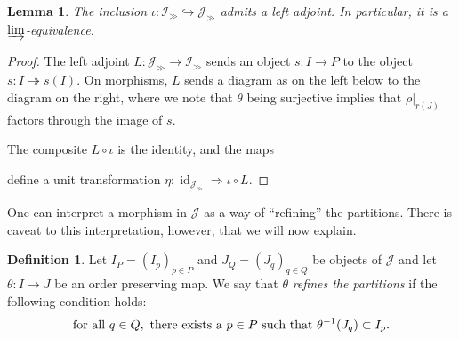\documentclass[12pt, reqno]{amsart}
\theoremstyle{plain}
\newtheorem{lemma}[theorem]{Lemma}
\theoremstyle{definition}
\newtheorem{definition}[theorem]{Definition}
\begin{document}
\begin{lemma}\label{Igg in Jgg cofinal}
The inclusion $\iota\colon \mathcal{I}_\gg\hookrightarrow \mathcal{J}_\gg$ admits a left adjoint. In particular, it is a $\varinjlim$-equivalence.
\end{lemma}
\begin{proof}
The left adjoint $L\colon \mathcal{J}_\gg \rightarrow \mathcal{I}_\gg$ sends an object $s\colon I\rightarrow P$ to the object $s\colon I\twoheadrightarrow s(I)$. On morphisms, $L$ sends a diagram as on the left below to the diagram on the right, where we note that $\theta$ being surjective implies that $\rho\vert_{r(J)}$ factors through the image of $s$.
\begin{center}
\end{center}
The composite $L\circ \iota$ is the identity, and the maps
\begin{center}
\end{center}
define a unit transformation $\eta\colon \operatorname{id}_{\mathcal{J}_\gg}\Rightarrow \iota\circ L$.
\end{proof}

One can interpret a morphism in $\mathcal{J}$ as a way of ``refining'' the partitions. There is caveat to this interpretation, however, that we will now explain.

\begin{definition}\label{refinement}
Let $I_P=(I_p)_{p\in P}$ and $J_Q=(J_q)_{q\in Q}$ be objects of $\mathcal{J}$ and let $\theta \colon I\rightarrow J$ be an order preserving map. We say that $\theta$ \textit{refines the partitions} if the following condition holds:
\begin{equation*}
\text{for all }q\in Q, \text{ there exists a } p\in P \text{ such that }\theta^{-1}(J_q)\subset I_p.\qedhere
\end{equation*}
\end{definition}
\end{document}

